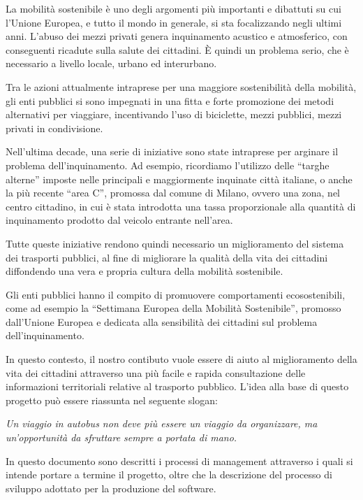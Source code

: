 La mobilit\`{a} sostenibile \`{e} uno degli argomenti pi\`{u} importanti e dibattuti su cui l\rq Unione Europea, e tutto il mondo in generale, si sta focalizzando negli ultimi anni. L\rq abuso dei mezzi privati genera inquinamento acustico e atmosferico, con conseguenti ricadute sulla salute dei cittadini. \`{E} quindi un problema serio, che \`{e} necessario a livello locale, urbano ed interurbano. 

Tra le azioni attualmente intraprese per una maggiore sostenibilit\`{a} della mobilit\`{a}, gli enti pubblici si sono impegnati in una fitta e forte promozione dei metodi alternativi per viaggiare, incentivando l\rq uso di biciclette, mezzi pubblici, mezzi privati in condivisione. 

Nell\rq ultima decade, una serie di iniziative sono state intraprese per arginare il problema dell\rq inquinamento. Ad esempio, ricordiamo l\rq utilizzo delle ``targhe alterne'' imposte nelle principali e maggiormente inquinate citt\`{a} italiane, o anche la pi\`{u} recente ``area C'', promossa dal comune di Milano, ovvero una zona, nel centro cittadino, in cui \`{e} stata introdotta una tassa proporzionale alla quantit\`{a} di inquinamento prodotto dal veicolo entrante nell\rq area.

Tutte queste iniziative rendono quindi necessario un miglioramento del sistema dei trasporti pubblici, al fine di migliorare la qualit\`{a} della vita dei cittadini diffondendo una vera e propria cultura della mobilit\`{a} sostenibile.

Gli enti pubblici hanno il compito di promuovere comportamenti ecosostenibili, come ad esempio la ``Settimana Europea della Mobilit\`{a} Sostenibile'', promosso dall\rq Unione Europea e dedicata alla sensibilit\`{a} dei cittadini sul problema dell\rq inquinamento.

In questo contesto, il nostro contibuto vuole essere di aiuto al miglioramento della vita dei cittadini attraverso una pi\`{u} facile e rapida consultazione delle informazioni territoriali relative al trasporto pubblico. L\rq idea alla base di questo progetto pu\`{o} essere riassunta nel seguente slogan:

\begin{center}
\emph{Un viaggio in autobus non deve pi\`{u} essere un viaggio da organizzare, ma un\rq opportunit\`{a} da sfruttare sempre a portata di mano.}
\end{center}

In questo documento sono descritti i processi di management attraverso i quali si intende portare a termine il progetto, oltre che la descrizione del processo di sviluppo adottato per la produzione del software. 

